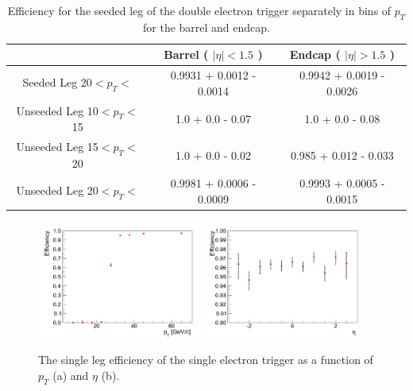 \begin{table}[!ht]
\begin{center}
\begin{tabular}{c|c|c} \hline
              & Barrel ( $|\eta|<1.5$ )  & Endcap ( $|\eta|>1.5$ )  \\  \hline
\hline
Seeded Leg 20$<p_{T}<$   & 0.9931 + 0.0012 - 0.0014 & 0.9942 + 0.0019 - 0.0026 \\ \hline
Unseeded Leg 10$<p_{T}<$15 & 1.0 + 0.0 - 0.07 & 1.0 + 0.0 - 0.08                 \\ \hline
Unseeded Leg 15$<p_{T}<$20 & 1.0 + 0.0 - 0.02 & 0.985 + 0.012 - 0.033            \\ \hline
Unseeded Leg 20$<p_{T}<$   & 0.9981 + 0.0006 - 0.0009 & 0.9993 + 0.0005 - 0.0015 \\
\hline
\end{tabular}
\caption{Efficiency for the seeded leg of the double electron trigger 
separately in bins of $p_{T}$ for the barrel and endcap.
\label{tab:eff_double_ele}}
\end{center}
\end{table}


\begin{figure}[!ht]
\begin{center}
\includegraphics[width=0.48\textwidth]{figures/ElectronTriggerEffVsPt_Ele27Tight.pdf}
\includegraphics[width=0.48\textwidth]{figures/ElectronTriggerEffVsEta_Ele27Tight.pdf}
\end{center}
\caption{The single leg efficiency of the single electron trigger as a function of $p_{T}$ (a) and $\eta$ (b).}
\label{fig:Ele27Efficiency}
\end{figure}


